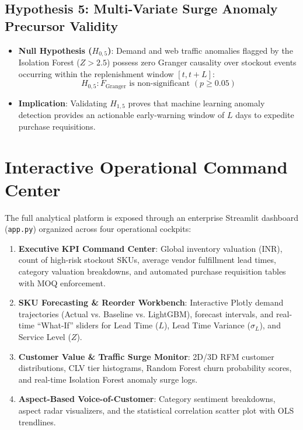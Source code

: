 \documentclass[11pt,a4paper]{article}
\begin{document}
\subsection{Hypothesis 5: Multi-Variate Surge Anomaly Precursor Validity}
\begin{itemize}[leftmargin=1.5em]
    \item \textbf{Null Hypothesis ($H_{0,5}$)}: Demand and web traffic anomalies flagged by the Isolation Forest ($Z > 2.5$) possess zero Granger causality over stockout events occurring within the replenishment window $[t, t + L]$:
    \begin{equation}
        H_{0,5}: F_{\text{Granger}} \text{ is non-significant } (p \ge 0.05)
    \end{equation}
    \item \textbf{Implication}: Validating $H_{1,5}$ proves that machine learning anomaly detection provides an actionable early-warning window of $L$ days to expedite purchase requisitions.
\end{itemize}

\section{Interactive Operational Command Center}
The full analytical platform is exposed through an enterprise Streamlit dashboard (\texttt{app.py}) organized across four operational cockpits:
\begin{enumerate}[leftmargin=1.5em, itemsep=3pt]
    \item \textbf{Executive KPI Command Center}: Global inventory valuation (INR), count of high-risk stockout SKUs, average vendor fulfillment lead times, category valuation breakdowns, and automated purchase requisition tables with MOQ enforcement.
    \item \textbf{SKU Forecasting \& Reorder Workbench}: Interactive Plotly demand trajectories (Actual vs. Baseline vs. LightGBM), forecast intervals, and real-time ``What-If'' sliders for Lead Time ($L$), Lead Time Variance ($\sigma_L$), and Service Level ($Z$).
    \item \textbf{Customer Value \& Traffic Surge Monitor}: 2D/3D RFM customer distributions, CLV tier histograms, Random Forest churn probability scores, and real-time Isolation Forest anomaly surge logs.
    \item \textbf{Aspect-Based Voice-of-Customer}: Category sentiment breakdowns, aspect radar visualizers, and the statistical correlation scatter plot with OLS trendlines.
\end{enumerate}
\end{document}
